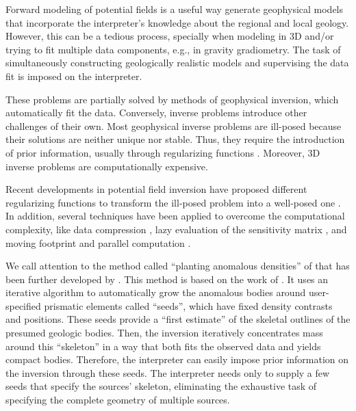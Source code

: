 \documentclass[twocolumn,draft]{svjour3}
\begin{document}
\begin{sloppypar}
Forward modeling of potential fields
is a useful way generate geophysical models
that incorporate the interpreter's knowledge
about the regional and local geology.
However, this can be a tedious process,
specially when modeling in 3D
and/or trying to fit multiple data components,
e.g., in gravity gradiometry.
The task of simultaneously
constructing geologically realistic models
and supervising the data fit
is imposed on the interpreter.

These problems are partially solved
by methods of geophysical inversion,
which automatically fit the data.
Conversely,
inverse problems introduce other challenges of their own.
Most geophysical inverse problems are ill-posed
because their solutions are neither unique nor stable.
Thus, they require the introduction of prior information,
usually through regularizing functions \citep{silva_potinversion}.
Moreover, 3D inverse problems are computationally expensive.

Recent developments in potential field inversion
have proposed different regularizing functions
to transform the ill-posed problem into a well-posed one
\citep[e.g.,][]{last_kubik, li_oldenburg, zhdanov_focusing, silva_interactive,
silvadias_adaptive, martins_tv}.
In addition,
several techniques have been applied
to overcome the computational complexity,
like data compression \citep{zhdanov_compression, li_compression},
lazy evaluation of the sensitivity matrix \citep{uieda_planting},
and moving footprint and parallel computation \citep{cuma_largescale}.

We call attention
to the method called ``planting anomalous densities''
of \citet{uieda_planting}
that has been further developed by \citet{uieda_shape}.
This method is based on
the work of \citet{rene}.
It uses an iterative algorithm
to automatically grow the anomalous bodies
around user-specified prismatic elements called ``seeds'',
which have fixed density contrasts and positions.
These seeds provide a ``first estimate''
of the skeletal outlines of the presumed geologic bodies.
Then,
the inversion iteratively concentrates mass
around this ``skeleton''
in a way that both
fits the observed data
and yields compact bodies.
Therefore,
the interpreter can easily impose prior information
on the inversion through these seeds.
The interpreter needs only to supply a few seeds
that specify the sources' skeleton,
eliminating the exhaustive task
of specifying the complete geometry of multiple sources.


\end{sloppypar}
\end{document}

